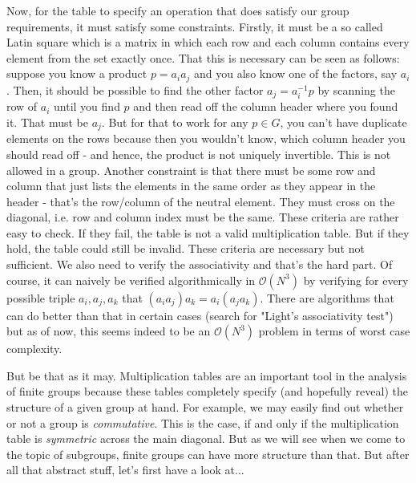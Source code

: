 \medskip
Now, for the table to specify an operation that does satisfy our group requirements, it must satisfy some constraints. Firstly, it must be a so called Latin square which is a matrix in which each row and each column contains every element from the set exactly once. That this is necessary can be seen as follows: suppose you know a product $p = a_i a_j$ and you also know one of the factors, say $a_i$. Then, it should be possible to find the other factor $a_j = a_i^{-1} p$ by scanning the row of $a_i$ until you find $p$ and then read off the column header where you found it. That must be $a_j$. But for that to work for any $p \in G$, you can't have duplicate elements on the rows because then you wouldn't know, which column header you should read off - and hence, the product is not uniquely invertible. This is not allowed in a group. Another constraint is that there must be some row and column that just lists the elements in the same order as they appear in the header - that's the row/column of the neutral element. They must cross on the diagonal, i.e. row and column index must be the same. These criteria are rather easy to check. If they fail, the table is not a valid multiplication table. But if they hold, the table could still be invalid. These criteria are necessary but not sufficient. We also need to verify the associativity and that's the hard part. Of course, it can naively be verified algorithmically in $\mathcal{O}(N^3)$ by verifying for every possible triple $a_i, a_j, a_k$ that $(a_i a_j) a_k = a_i (a_j a_k)$. There are algorithms that can do better than that in certain cases (search for "Light's associativity test") but as of now, this seems indeed to be an $\mathcal{O}(N^3)$ problem in terms of worst case complexity.

\medskip
But be that as it may. Multiplication tables are an important tool in the analysis of finite groups because these tables completely specify (and hopefully reveal) the structure of a given group at hand. For example, we may easily find out whether or not a group is \emph{commutative}. This is the case, if and only if the multiplication table is \emph{symmetric} across the main diagonal. But as we will see when we come to the topic of subgroups, finite groups can have more structure than that. But after all that abstract stuff, let's first have a look at...



